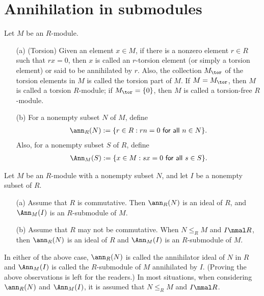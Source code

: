 \section{Annihilation in submodules}

\begin{defi}
    Let $M$ be an $R$-module.
    \begin{enumerate}
        \item[(a)]
        {
            (Torsion)
            Given an element $x\in M$, if there is a nonzero element $r\in R$ such that $rx=0$, then $x$ is called an $r$-torsion element (or simply a torsion element) or said to be annihilated by $r$.
            Also, the collection $M_\tor$ of the torsion elements in $M$ is called the torsion part of $M$.
            If $M=M_\tor$, then $M$ is called a torsion $R$-module; if $M_\tor=\{0\}$, then $M$ is called a torsion-free $R$-module.
        }
        \item[(b)]
        {
            For a nonempty subset $N$ of $M$, define
            \begin{align*}
                \ann_R(N):=\{r\in R: rn=0\textsf{ for all }n\in N\}.
            \end{align*}
            Also, for a nonempty subset $S$ of $R$, define
            \begin{align*}
                \Ann_M(S):=\{x\in M: sx=0\textsf{ for all }s\in S\}.
            \end{align*}
        }
    \end{enumerate}
\end{defi}
\begin{obs}
    Let $M$ be an $R$-module with a nonempty subset $N$, and let $I$ be a nonempty subset of $R$.
    \begin{enumerate}
        \item[(a)]
        {
            Assume that $R$ is commutative.
            Then $\ann_R(N)$ is an ideal of $R$, and $\Ann_M(I)$ is an $R$-submodule of $M$.
        }
        \item[(b)]
        {
            Assume that $R$ may not be commutative.
            When $N\leq_R M$ and $I\nmal R$, then $\ann_R(N)$ is an ideal of $R$ and $\Ann_M(I)$ is an $R$-submodule of $M$.
        }
    \end{enumerate}
    In either of the above case, $\ann_R(N)$ is called the annihilator ideal of $N$ in $R$ and $\Ann_M(I)$ is called the $R$-submodule of $M$ annihilated by $I$.
    \color{brown}(Proving the above observations is left for the readers.) \color{black}
    In most situations, when considering $\ann_R(N)$ and $\Ann_M(I)$, it is assumed that $N\leq_R M$ and $I\nmal R$.
\end{obs}
